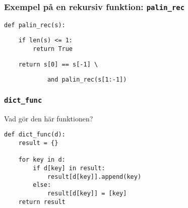 \documentclass{beamer}
\begin{document}
  \begin{frame}[fragile]
    \frametitle{Exempel på en rekursiv funktion: \texttt{palin\_rec}}

    \begin{verbatim}
def palin_rec(s):
    \end{verbatim}
    \vspace{-1.5em}
    \pause{}
    \begin{verbatim}
    if len(s) <= 1:
        return True
    \end{verbatim}
    \vspace{-1.5em}
    \pause{}
    \begin{verbatim}
    return s[0] == s[-1] \
    \end{verbatim}
    \vspace{-1.5em}
    \pause{}
    \begin{verbatim}
            and palin_rec(s[1:-1])
    \end{verbatim}

  \end{frame}

  \begin{frame}[fragile]
    \frametitle{\texttt{dict\_func}}

    Vad gör den här funktionen?

    \begin{verbatim}
def dict_func(d):
    result = {}

    for key in d:
        if d[key] in result:
            result[d[key]].append(key)
        else:
            result[d[key]] = [key]
    return result
    \end{verbatim}

  \end{frame}
\end{document}
